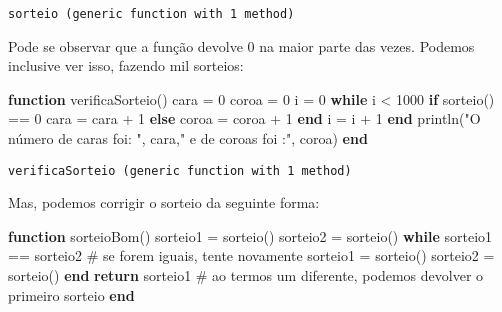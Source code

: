 \documentclass[
  letterpaper,
  DIV=11,
  numbers=noendperiod]{scrreprt}
\newenvironment{Shaded}{\begin{snugshade}}{\end{snugshade}}
\newcommand{\CommentTok}[1]{\textcolor[rgb]{0.37,0.37,0.37}{#1}}
\newcommand{\ControlFlowTok}[1]{\textcolor[rgb]{0.00,0.23,0.31}{\textbf{#1}}}
\newcommand{\FloatTok}[1]{\textcolor[rgb]{0.68,0.00,0.00}{#1}}
\newcommand{\FunctionTok}[1]{\textcolor[rgb]{0.28,0.35,0.67}{#1}}
\newcommand{\KeywordTok}[1]{\textcolor[rgb]{0.00,0.23,0.31}{\textbf{#1}}}
\newcommand{\NormalTok}[1]{\textcolor[rgb]{0.00,0.23,0.31}{#1}}
\newcommand{\OperatorTok}[1]{\textcolor[rgb]{0.37,0.37,0.37}{#1}}
\newcommand{\StringTok}[1]{\textcolor[rgb]{0.13,0.47,0.30}{#1}}
\begin{document}
\begin{verbatim}
sorteio (generic function with 1 method)
\end{verbatim}

Pode se observar que a função devolve 0 na maior parte das vezes.
Podemos inclusive ver isso, fazendo mil sorteios:

\begin{Shaded}
\begin{Highlighting}[]
\KeywordTok{function} \FunctionTok{verificaSorteio}\NormalTok{()}
\NormalTok{   cara }\OperatorTok{=} \FloatTok{0}
\NormalTok{   coroa }\OperatorTok{=} \FloatTok{0}
\NormalTok{   i }\OperatorTok{=} \FloatTok{0}
   \ControlFlowTok{while}\NormalTok{ i }\OperatorTok{\textless{}} \FloatTok{1000}
     \ControlFlowTok{if} \FunctionTok{sorteio}\NormalTok{() }\OperatorTok{==} \FloatTok{0}
\NormalTok{        cara }\OperatorTok{=}\NormalTok{ cara }\OperatorTok{+} \FloatTok{1}
     \ControlFlowTok{else}
\NormalTok{        coroa }\OperatorTok{=}\NormalTok{ coroa }\OperatorTok{+} \FloatTok{1}
     \ControlFlowTok{end}
\NormalTok{     i }\OperatorTok{=}\NormalTok{ i }\OperatorTok{+} \FloatTok{1}
   \ControlFlowTok{end}
   \FunctionTok{println}\NormalTok{(}\StringTok{"O número de caras foi: "}\NormalTok{, cara,}\StringTok{" e de coroas foi :"}\NormalTok{, coroa)}
\KeywordTok{end}
\end{Highlighting}
\end{Shaded}

\begin{verbatim}
verificaSorteio (generic function with 1 method)
\end{verbatim}

Mas, podemos corrigir o sorteio da seguinte forma:

\begin{Shaded}
\begin{Highlighting}[]
\KeywordTok{function} \FunctionTok{sorteioBom}\NormalTok{()}
\NormalTok{   sorteio1 }\OperatorTok{=} \FunctionTok{sorteio}\NormalTok{()}
\NormalTok{   sorteio2 }\OperatorTok{=} \FunctionTok{sorteio}\NormalTok{()}
   \ControlFlowTok{while}\NormalTok{ sorteio1 }\OperatorTok{==}\NormalTok{ sorteio2 }\CommentTok{\# se forem iguais, tente novamente}
\NormalTok{     sorteio1 }\OperatorTok{=} \FunctionTok{sorteio}\NormalTok{()}
\NormalTok{     sorteio2 }\OperatorTok{=} \FunctionTok{sorteio}\NormalTok{()}
   \ControlFlowTok{end}
   \ControlFlowTok{return}\NormalTok{ sorteio1   }\CommentTok{\# ao termos um diferente, podemos devolver o primeiro sorteio}
\KeywordTok{end}
\end{Highlighting}
\end{Shaded}
\end{document}
